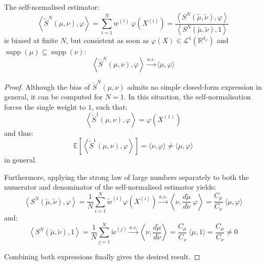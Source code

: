 \begin{proposition}\label{th:self_normalised_estimator}
	The self-normalised estimator:
	\begin{equation}
		\left\langle\tilde{S}^N(\mu,\nu),\varphi\right\rangle=\sum_{i=1}^Nw^{(i)}\:\varphi\left(X^{(i)}\right)=\frac{\displaystyle\left\langle S^N(\tilde{\mu},\tilde{\nu}),\varphi\right\rangle}{\displaystyle\left\langle S^N(\tilde{\mu},\tilde{\nu}),1\right\rangle}
	\end{equation}
	is biased at finite $N$, but consistent as soon as $\varphi(X)\in\mathcal{L}^1(\mathbb{R}^{d_{\varphi}})$ and $\operatorname{supp}(\mu)\subseteq\operatorname{supp}(\nu)$:
	\begin{equation}
		\left\langle\tilde{S}^N(\mu,\nu),\varphi\right\rangle\overset{a.s.}{\longrightarrow}\langle\mu,\varphi\rangle
	\end{equation}
\end{proposition}

\begin{proof}
	Although the bias of $\tilde{S}^N(\mu,\nu)$ admits no simple closed-form expression in general, it can be computed for $N=1$. In this situation, the self-normalisation forces the single weight to $1$, such that:
	\begin{equation}
		\left\langle\tilde{S}^1(\mu,\nu),\varphi\right\rangle=\varphi\left(X^{(1)}\right)
	\end{equation}
	and thus:
	\begin{equation}
		\mathbb{E}\left[\left\langle\tilde{S}^1(\mu,\nu),\varphi\right\rangle\right]=\langle\nu,\varphi\rangle\neq\langle\mu,\varphi\rangle
	\end{equation}
	in general.

	Furthermore, applying the strong law of large numbers separately to both the numerator and denominator of the self-normalised estimator yields:
	\begin{equation}
		\left\langle S^N(\tilde{\mu},\tilde{\nu}),\varphi\right\rangle=\frac{1}{N}\sum_{i=1}^N\tilde{w}^{(i)}\varphi\left(X^{(i)}\right)\overset{a.s.}{\longrightarrow}\left\langle\nu,\frac{d\tilde{\mu}}{d\tilde{\nu}}\:\varphi\right\rangle=\frac{C_\mu}{C_\nu}\:\langle\mu,\varphi\rangle
	\end{equation}
	and:
	\begin{equation}
		\left\langle S^N(\tilde{\mu},\tilde{\nu}),1\right\rangle=\frac{1}{N}\sum_{j=1}^N\tilde{w}^{(j)}\overset{a.s.}{\longrightarrow}\left\langle\nu,\frac{d\tilde{\mu}}{d\tilde{\nu}}\right\rangle=\frac{C_\mu}{C_\nu}\:\langle\mu,1\rangle=\frac{C_\mu}{C_\nu}\neq0
	\end{equation}

	Combining both expressions finally gives the desired result.
\end{proof}

